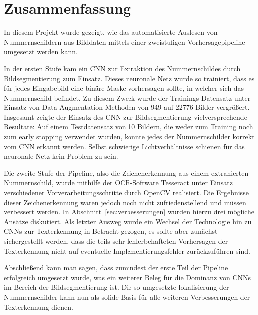 \section{Zusammenfassung}
\label{sec:zusammenfassung}

In diesem Projekt wurde gezeigt, wie das automatisierte Auslesen
von Nummernschildern aus Bilddaten mittels einer zweistufigen
Vorhersagepipeline umgesetzt werden kann.

In der ersten Stufe kam ein CNN zur Extraktion des Nummernschildes durch
Bildsegmentierung zum Einsatz.
Dieses neuronale Netz wurde so trainiert, dass es f\"ur jedes
Eingabebild eine bin\"are Maske vorhersagen sollte, in welcher
sich das Nummernschild befindet.
Zu diesem Zweck wurde der Trainings-Datensatz unter
Einsatz von Data-Augmentation Methoden von 949 auf 22776 Bilder
vergr\"o{\ss}ert.
Insgesamt zeigte der Einsatz des CNN zur Bildsegmentierung vielversprechende
Resultate: Auf einem Testdatensatz von 10 Bildern, die weder zum Training
noch zum early stopping verwendet wurden, konnte jedes der Nummernschilder
korrekt vom CNN erkannt werden. Selbst schwierige Lichtverh\"altnisse schienen
f\"ur das neuronale Netz kein Problem zu sein.

Die zweite Stufe der Pipeline, also die Zeichenerkennung aus einem
extrahierten Nummernschild, wurde mithilfe der OCR-Software Tesseract
unter Einsatz verschiedener Vorverarbeitungsschritte durch OpenCV realisiert.
Die Ergebnisse dieser Zeichenerkennung waren jedoch noch nicht
zufriedenstellend und m\"ussen verbessert werden.
In Abschnitt~\ref{sec:verbesserungen} wurden hierzu drei m\"ogliche
Ans\"atze diskutiert. Als letzter Ausweg wurde ein Wechsel der
Technologie hin zu CNNs zur Texterkennung in Betracht gezogen, es sollte
aber zun\"achst sichergestellt werden, dass die teils sehr
fehlerbehafteten Vorhersagen der Texterkennung nicht auf eventuelle
Implementierungsfehler zur\"uckzuf\"uhren sind.

Abschlie{\ss}end kann man sagen, dass zumindest der erste Teil der
Pipeline erfolgreich umgesetzt wurde, was ein weiterer Beleg f\"ur die
Dominanz von CNNs im Bereich der Bildsegmentierung ist.
Die so umgesetzte lokalisierung der Nummernschilder kann nun als solide Basis f\"ur
alle weiteren Verbesserungen der Texterkennung dienen.
